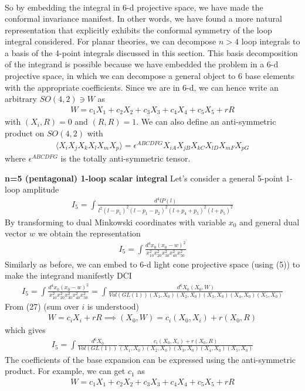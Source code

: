 \documentclass[12pt]{scrartcl}
\begin{document}
{\begin{align}
\end{align}
So by embedding the integral in 6-d projective space, we have made the conformal invariance manifest. In other words, we have found a more natural representation that explicitly exhibits the conformal symmetry of the loop integral considered. For planar theories, we can decompose $n > 4$ loop integrals to a basis of the 4-point integrals discussed in this section. This basis decomposition of the integrand is possible because we have embedded the problem in a 6-d projective space, in which we can decompose a general object to 6 base elements with the appropriate coefficients. Since we are in 6-d, we can hence write an arbitrary $SO(4,2) \ni W$ as
\begin{align}
    W = c_1X_1 + c_2X_2 + c_3X_3 + c_4X_4 + c_5X_5 +rR
\end{align}
with $(X_i,R) = 0$ and $(R,R) = 1$. We can also define an anti-symmetric product on $SO(4,2)$ with
\begin{align}
    \langle X_iX_jX_kX_lX_mX_p \rangle = \epsilon^{ABCDFG}X_{iA}X_{jB}X_{kC}X_{lD}X_{mF}X_{pG}
\end{align}
where $\epsilon^{ABCDFG}$ is the totally anti-symmetric tensor.


\textbf{n=5 (pentagonal) 1-loop scalar integral}
Let's consider a general 5-point 1-loop amplitude
\begin{align}
    I_5 = \int \frac{d^4lP(l)}{l^2(l-p_1)^2(l-p_1-p_2)^2(l+p_4 + p_5)^2(l + p_5)^2}
\end{align}
By transforming to dual Minkowski coordinates with variable $x_0$ and general dual vector $w$ we obtain the representation  
\begin{align}
    I_5 = \int \frac{d^4x_0(x_0 - w)^2}{x_{10}^2x_{20}^2x_{30}^2x_{40}^2x_{50}^2}
\end{align}
Similarly as before, we can embed to 6-d light cone projective space (using (5)) to make the integrand manifestly DCI
\begin{align}
    I_5 = \int \frac{d^4x_0(x_0 - w)^2}{x_{10}^2x_{20}^2x_{30}^2x_{40}^2x_{50}^2} = \int \frac{d^6X_0(X_0,W)}{Vol(GL(1))(X_1,X_0)(X_2,X_0)(X_3,X_0)(X_4,X_0)(X_5,X_0)}
\end{align}
From (27) (sum over $i$ is understood)
\begin{align}
    W = c_iX_i + rR \implies (X_0,W) = c_{i}(X_0,X_i) + r(X_0,R)
\end{align}
which gives
\begin{align}
    I_5 = \int \frac{d^6X_0}{Vol(GL(1))}\frac{c_{i}(X_0,X_i) + r(X_0,R)}{(X_1,X_0)(X_2,X_0)(X_3,X_0)(X_4,X_0)(X_5,X_0)}
\end{align}
The coefficients of the base expansion can be expressed using the anti-symmetric product. For example, we can get $c_1$ as
\begin{align}
    W = c_1X_1 + c_2X_2 + c_3X_3 + c_4X_4 + c_5X_5 + rR
\end{align}

}
\end{document}
